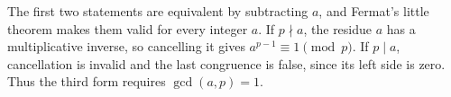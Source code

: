 The first two statements are equivalent by subtracting $a$, and Fermat's little theorem makes them valid for every integer $a$. If $p\nmid a$, the residue $a$ has a multiplicative inverse, so cancelling it gives $a^{p-1}\equiv1\pmod p$. If $p\mid a$, cancellation is invalid and the last congruence is false, since its left side is zero. Thus the third form requires $\gcd(a,p)=1$.
